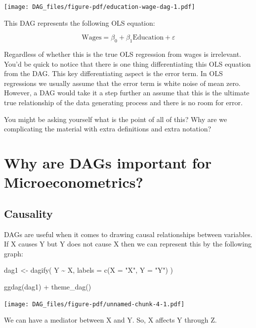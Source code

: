 \documentclass[
  letterpaper,
  DIV=11,
  numbers=noendperiod]{scrreprt}
\newenvironment{Shaded}{\begin{snugshade}}{\end{snugshade}}
\newcommand{\AttributeTok}[1]{\textcolor[rgb]{0.40,0.45,0.13}{#1}}
\newcommand{\FunctionTok}[1]{\textcolor[rgb]{0.28,0.35,0.67}{#1}}
\newcommand{\NormalTok}[1]{\textcolor[rgb]{0.00,0.23,0.31}{#1}}
\newcommand{\OtherTok}[1]{\textcolor[rgb]{0.00,0.23,0.31}{#1}}
\newcommand{\SpecialCharTok}[1]{\textcolor[rgb]{0.37,0.37,0.37}{#1}}
\newcommand{\StringTok}[1]{\textcolor[rgb]{0.13,0.47,0.30}{#1}}
\theoremstyle{definition}
\theoremstyle{remark}
\begin{document}
\texttt{[image: DAG\_files/figure-pdf/education-wage-dag-1.pdf]}

This DAG represents the following OLS equation:

\[
\text{Wages} = \beta_0 + \beta_1 \text{Education} + \varepsilon
\]

Regardless of whether this is the true OLS regression from wages is
irrelevant. You'd be quick to notice that there is one thing
differentiating this OLS equation from the DAG. This key differentiating
aspect is the error term. In OLS regressions we usually assume that the
error term is white noise of mean zero. However, a DAG would take it a
step further an assume that this is the ultimate true relationship of
the data generating process and there is no room for error.

You might be asking yourself what is the point of all of this? Why are
we complicating the material with extra definitions and extra notation?

\chapter{Why are DAGs important for
Microeconometrics?}\label{why-are-dags-important-for-microeconometrics}

\section{Causality}\label{causality-1}

DAGs are useful when it comes to drawing causal relationships between
variables. If X causes Y but Y does not cause X then we can represent
this by the following graph:

\begin{Shaded}
\begin{Highlighting}[]
\NormalTok{dag1 }\OtherTok{\textless{}{-}} \FunctionTok{dagify}\NormalTok{(}
\NormalTok{  Y }\SpecialCharTok{\textasciitilde{}}\NormalTok{ X,}
  \AttributeTok{labels =} \FunctionTok{c}\NormalTok{(}\AttributeTok{X =} \StringTok{"X"}\NormalTok{, }\AttributeTok{Y =} \StringTok{"Y"}\NormalTok{)}
\NormalTok{)}

\FunctionTok{ggdag}\NormalTok{(dag1) }\SpecialCharTok{+}
  \FunctionTok{theme\_dag}\NormalTok{()}
\end{Highlighting}
\end{Shaded}

\texttt{[image: DAG\_files/figure-pdf/unnamed-chunk-4-1.pdf]}

We can have a mediator between X and Y. So, X affects Y through Z.
\end{document}
